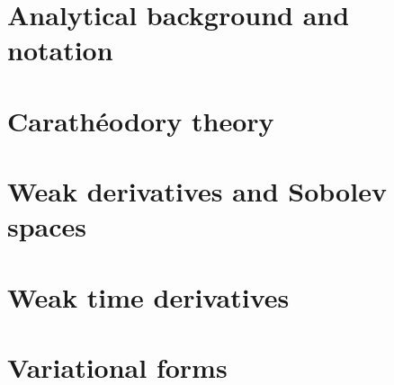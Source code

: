 \section{Analytical background and notation}


\section{Carath\'eodory theory}


\section{Weak derivatives and Sobolev spaces}
\label{sec:weak_derivatives}


\section {Weak time derivatives}


\section{Variational forms}
\label{sec:weak_forms}
